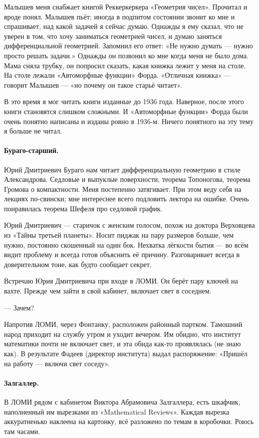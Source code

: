 \documentclass{book}
\begin{document}
Малышев меня снабжает книгой Реккеркеркера «Геометрия чисел».
Прочитал и вроде понял.
Малышев пьёт;
иногда в подпитом состоянии звонит ко мне и спрашивает, над какой задачей я сейчас думаю.
Однажды я ему сказал, что не уверен в том, что хочу заниматься геометрией чисел, и думаю заняться дифференциальной геометрией.
Запомнил его ответ: «Не нужно думать --- нужно просто решать задачи.»
Однажды он позвонил ко мне когда меня не было дома.
Мама сняла трубку,
он попросил сказать, какая книжка лежит у меня на столе.
На столе лежали «Автоморфные функции» Форда.
«Отличная книжка» --- говорит Малышев --- «но почему он такое старьё читает».

В это время я мог читать книги изданные до 1936 года.
Наверное, после этого книги становятся слишком сложными.
И «Автоморфные функции» Форда были очень понятно написаны и изданы ровно в 1936-м.
Ничего понятного на эту тему я больше не читал.

\paragraph{Бураго-старший.}
Юрий Дмитриевич Бураго нам читает дифференциальную геометрию в стиле Александрова.
Седловые и выпуклые поверхности,
теорема Топоногова, 
теорема Громова о компактности.
Меня постепенно затягивает.
При этом веду себя на лекциях по-свински;
мне интереснее всего подловить лектора на ошибке.
Очень понравилась теорема Шефеля про седловой график.

Юрий Дмитриевич --- старичок с женским голосом,
похож на доктора Верховцева из «Тайны третьей планеты».
Носит пиджак на пару размеров больше, чем нужно,
постоянно скошенный на один бок.
Нехватка лёгкости бытия --- во всём видит проблему и всегда готов объяснить её причину.
Разговаривает всегда в доверительном тоне,
как будто сообщает секрет.

Встречаю Юрия Дмитриевича при входе в ЛОМИ.
Он берёт пару ключей на вахте.
Прежде чем зайти в свой кабинет, включает свет в соседнем.

--- Зачем?

Напротив ЛОМИ, через Фонтанку, расположен районный партком.
Тамошний народ приходит на службу утром и уходит вечером.
Им обидно, что институт математики почти не включает свет, и эта обида как-то проявлялась (не знаю как).
В результате Фадеев (директор института) выдал распоряжение: «Пришёл на работу --- включи свет соседу».

\paragraph{Залгаллер.}
В ЛОМИ рядом с кабинетом Виктора Абрамовича Залгаллера, есть шкафчик, наполненный им вырезками из  «Math\-em\-at\-ical Reviews».
Каждая вырезка аккуратненько наклеена на картонку, 
всё разложено по темам в коробочки.
Роюсь там часами.
\end{document}
